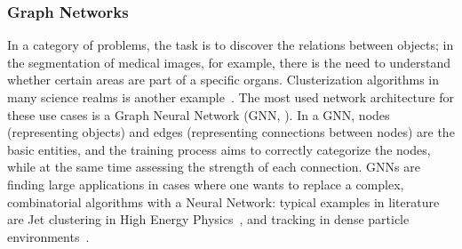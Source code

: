 \subsubsection{Graph Networks}
In a category of problems, the task is to discover the relations between objects; in the  segmentation of medical images, for example, there is the need to understand whether certain areas are part of a specific organs. Clusterization algorithms in many science realms is another example~\cite{clusterization}.
The most used  network architecture for these use cases is a Graph Neural Network (GNN, \cite{gnn}).
In a GNN, nodes (representing objects) and edges (representing connections between nodes) are the basic entities, and the training process aims to correctly categorize the nodes, while at the same time assessing the strength of each connection.
GNNs are finding large applications in cases where one wants to replace a complex, combinatorial algorithms with a Neural Network: typical examples in literature are Jet clustering in High Energy Physics~\cite{graphclustering}, and tracking in dense particle environments~\cite{graphtracking}.


% 

